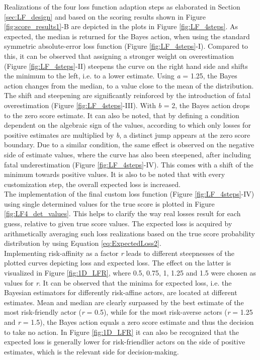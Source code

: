 			Realizations of the four loss function adaption steps as elaborated in Section \ref{sec:LF_design} and based on the scoring results shown in Figure \ref{fig:score_results1}-B are depicted in the plots in Figure \ref{fig:LF_4steps}.
			As expected, the median is returned for the Bayes action, when using the standard symmetric absolute-error loss function (Figure \ref{fig:LF_4steps}-I). Compared to this, it can be observed that assigning a stronger weight on overestimation (Figure \ref{fig:LF_4steps}-II) steepens the curve on the right hand side and shifts the minimum to the left, i.e. to a lower estimate. Using \textit{a} = 1.25, the Bayes action changes from the median, to a value close to the mean of the distribution. The shift and steepening are significantly reinforced by the introduction of fatal overestimation (Figure \ref{fig:LF_4steps}-III). With \textit{b} = 2, the Bayes action drops to the zero score estimate. It can also be noted, that by defining a condition dependent on the algebraic sign of the values, according to which only losses for positive estimates are multiplied by \textit{b}, a distinct jump appears at the zero score boundary. Due to a similar condition, the same effect is observed on the negative side of estimate values, where the curve has also been steepened, after including fatal underestimation (Figure \ref{fig:LF_4steps}-IV). This comes with a shift of the minimum towards positive values. It is also to be noted that with every customization step, the overall expected loss is increased.\\			
			The implementation of the final custom loss function (Figure \ref{fig:LF_4steps}-IV) using single determined values for the true score is plotted in Figure \ref{fig:LF4_det_values}. This helps to clarify the way real losses result for each guess, relative to given true score values. The expected loss is acquired by arithmetically averaging such loss realizations based on the true score probability distribution by using Equation \ref{eq:ExpectedLoss2}.\\			
			Implementing risk-affinity as a factor \textit{r} leads to different steepnesses of the plotted curves depicting loss and expected loss. The effect on the latter is visualized in Figure \ref{fig:1D_LFR}, where 0.5, 0.75, 1, 1.25 and 1.5 were chosen as values for \textit{r}. 	
			It can be observed that the minima for expected loss, i.e. the Bayesian estimators for differently risk-affine actors, are located at different estimates. Mean and median are clearly surpassed by the best estimate of the most risk-friendly actor (\textit{r} = 0.5), while for the most risk-averse actors (\textit{r} = 1.25 and \textit{r} = 1.5), the Bayes action equals a zero score estimate and thus the decision to take no action. In Figure \ref{fig:1D_LFR} it can also be recognized that the expected loss is generally lower for risk-friendlier actors on the side of positive estimates, which is the relevant side for decision-making.
			
